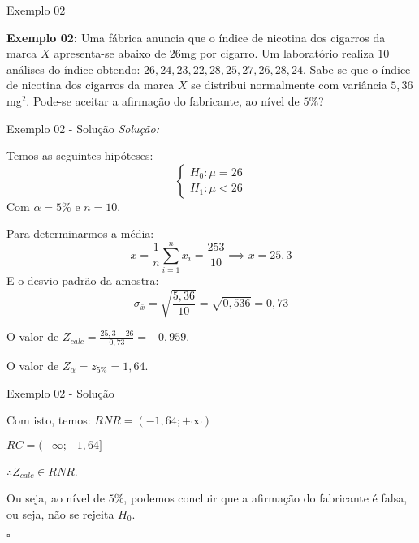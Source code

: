 \documentclass[hyperref={pdfpagelabels=false}]{beamer}
\begin{document}
\begin{frame}{Exemplo 02}
	
\textbf{Exemplo 02:} Uma fábrica anuncia que o índice de nicotina dos cigarros da marca $X$ apresenta-se abaixo de $26$mg por cigarro. Um laboratório realiza $10$ análises do índice obtendo: $26,24,23,22,28,25,27,26,28,24$. Sabe-se que o índice de nicotina dos cigarros da marca $X$ se distribui normalmente com variância $5,36$mg$^2$. Pode-se aceitar a afirmação do fabricante, ao nível de $5\%$?
		
\end{frame}

\begin{frame}{Exemplo 02 - Solução}
\textit{Solução:}

Temos as seguintes hipóteses: \pause
$$\begin{cases}
H_0:\mu = 26\\
H_1:\mu < 26
\end{cases}
$$ \pause
Com $\alpha = 5\%$ e $n=10$. \pause

Para determinarmos a média: \pause
$$\bar{x} = \frac{1}{n}\sum_{i = 1}^n \bar{x}_i = \frac{253}{10} \implies \bar{x} = 25,3$$ \pause
E o desvio padrão da amostra: \pause
$$\sigma_{\bar{x}} = \sqrt{\frac{5,36}{10}} = \sqrt{0,536} = 0,73$$ \pause

O valor de $Z_{calc} = \frac{25,3 - 26}{0,73} = -0,959$. \pause

O valor de $Z_{\alpha} = z_{5\%} = 1,64$.
\end{frame}
\begin{frame}{Exemplo 02 - Solução}
	
Com isto, temos: \pause
$RNR = (-1,64; + \infty)$ \pause

$RC = (-\infty;-1,64]$ \pause

$\therefore Z_{calc} \in RNR$. \pause

Ou seja, ao nível de $5\%$, podemos concluir que a afirmação do fabricante é falsa, ou seja, não se rejeita $H_0$.

\begin{flushright}
	$\square$
\end{flushright}

\end{frame}
\end{document}
